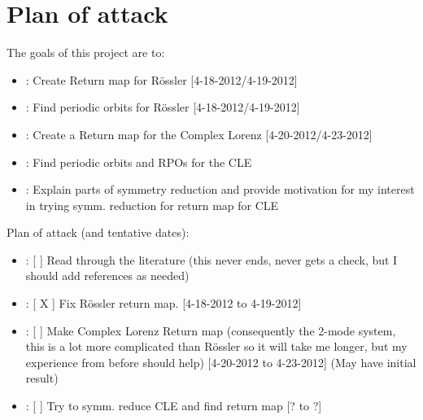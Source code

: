 \documentclass[12 pt]{article}
\begin{document}
\section{Plan of attack}
The goals of this project are to:
\begin{itemize}
    \item: Create Return map for R\"ossler [4-18-2012/4-19-2012]
    \item: Find periodic orbits for R\"ossler [4-18-2012/4-19-2012]
    \item: Create a Return map for the Complex Lorenz [4-20-2012/4-23-2012]
    \item: Find periodic orbits and RPOs for the CLE
    \item: Explain parts of symmetry reduction and provide motivation for my interest in trying symm. reduction for return map for CLE
\end{itemize}
Plan of attack (and tentative dates):
\begin{itemize}
    \item:   [  ] Read through the literature (this never ends, never gets a check, but I should add references as needed)
    \item:   [ X ] Fix R\"ossler return map. [4-18-2012 to 4-19-2012]
    \item:   [  ] Make Complex Lorenz Return map (consequently the 2-mode system, this is a lot more complicated than R\"ossler so it will take me longer, but my experience from before should help) [4-20-2012 to 4-23-2012] (May have initial result)
    \item:   [  ] Try to symm. reduce CLE and find return map [? to ?]
\end{itemize}

\newpage

\end{document}
